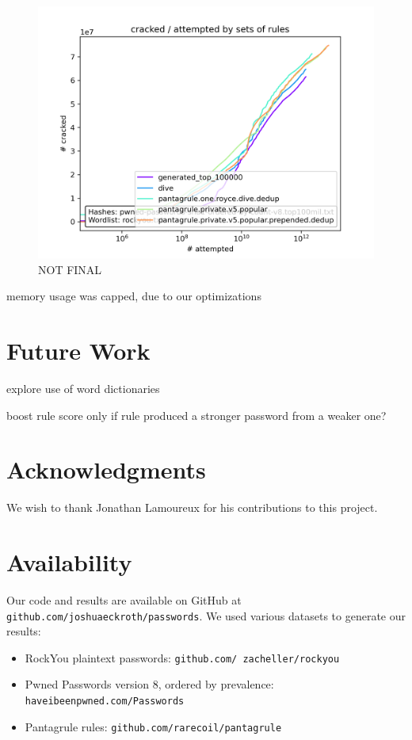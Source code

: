 \documentclass[letterpaper,twocolumn,10pt]{article}
\begin{document}
\begin{figure}
    \includegraphics[width=\linewidth]
    {../cracked_attempted_plot_08318a9a-a503-11ed-9d73-005056c00001.png}
    \caption{NOT FINAL}
    \label{fig:cracked-attempted}
\end{figure}

memory usage was capped, due to our optimizations

\section{Future Work}

explore use of word dictionaries

boost rule score only if rule produced a stronger password from a weaker one?

\section*{Acknowledgments}

We wish to thank Jonathan Lamoureux for his contributions to this project.

\section*{Availability}

Our code and results are available on GitHub at
\texttt{github.com/joshuaeckroth/passwords}. We used various datasets
to generate our results:

\begin{itemize}
\item RockYou plaintext passwords:
\texttt{github.com/ zacheller/rockyou}
\item Pwned Passwords version 8, ordered by prevalence:
\texttt{haveibeenpwned.com/Passwords}
\item Pantagrule rules: \texttt{github.com/rarecoil/pantagrule}
\end{itemize}
\end{document}
